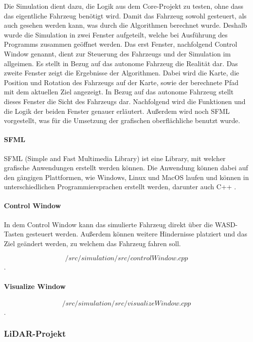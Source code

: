 Die Simulation dient dazu, die Logik aus dem Core-Projekt zu testen, ohne dass das eigentliche Fahrzeug benötigt wird. Damit das Fahrzeug sowohl gesteuert, als auch gesehen werden kann, was durch die Algorithmen berechnet wurde. Deshalb wurde die Simulation in zwei Fenster aufgeteilt, welche bei Ausführung des Programms zusammen geöffnet werden. Das erst Fenster, nachfolgend Control Window genannt, dient zur Steuerung des Fahrzeugs und der Simulation im allgeimen. Es stellt in Bezug auf das autonome Fahrzeug die Realität dar. Das zweite Fenster zeigt die Ergebnisse der Algorithmen. Dabei wird die Karte, die Position und Rotation des Fahrzeugs auf der Karte, sowie der berechnete Pfad mit dem aktuellen Ziel angezeigt. In Bezug auf das autonome Fahrzeug stellt dieses Fenster die Sicht des Fahrzeugs dar. Nachfolgend wird die Funktionen und die Logik der beiden Fenster genauer erläutert. Außerdem wird noch SFML vorgestellt, was für die Umsetzung der grafischen oberflächliche benutzt wurde. 

\paragraph{SFML}

SFML (Simple and Fast Multimedia Library) ist eine Library, mit welcher grafische Anwendungen erstellt werden können. Die Anwendung können dabei auf den gängigen Plattformen, wie Windows, Linux und MacOS laufen und können in unterschiedlichen Programmiersprachen erstellt werden, darunter auch C++ \cite{sfml}. 

\paragraph{Control Window}

In dem Control Window kann das simulierte Fahrzeug direkt über die \dq WASD\dq-Tasten gesteuert werden. Außerdem können weitere Hindernisse platziert und das Ziel geändert werden, zu welchem das Fahrzeug fahren soll. 

\[/src/simulation/src/controlWindow.cpp\]. 

\paragraph{Visualize Window}

\[/src/simulation/src/visualizeWindow.cpp\]. 

\subsubsection{LiDAR-Projekt}



